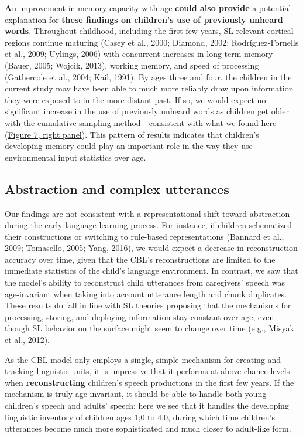\documentclass[
  english,
  man,mask,floatsintext]{apa6}
\begin{document}
\textbf{A}n improvement in memory capacity with age \textbf{could also provide} a potential explanation for \textbf{these findings on children's use of previously unheard words}. Throughout childhood, including the first few years, SL-relevant cortical regions continue maturing (Casey et al., 2000; Diamond, 2002; Rodríguez-Fornells et al., 2009; Uylings, 2006) with concurrent increases in long-term memory (Bauer, 2005; Wojcik, 2013), working memory, and speed of processing (Gathercole et al., 2004; Kail, 1991). By ages three and four, the children in the current study may have been able to much more reliably draw upon information they were exposed to in the more distant past. If so, we would expect no significant increase in the use of previously unheard words as children get older with the cumulative sampling method---consistent with what we found here (\protect\hyperlink{fig7}{Figure 7, right panel}). This pattern of results indicates that children's developing memory could play an important role in the way they use environmental input statistics over age.

\hypertarget{abstraction-and-complex-utterances}{%
\subsection{Abstraction and complex utterances}\label{abstraction-and-complex-utterances}}

Our findings are not consistent with a representational shift toward abstraction during the early language learning process. For instance, if children schematized their constructions or switching to rule-based representations (Bannard et al., 2009; Tomasello, 2005; Yang, 2016), we would expect a decrease in reconstruction accuracy over time, given that the CBL's reconstructions are limited to the immediate statistics of the child's language environment. In contrast, we saw that the model's ability to reconstruct child utterances from caregivers' speech was age-invariant when taking into account utterance length and chunk duplicates. These results do fall in line with SL theories proposing that the mechanisms for processing, storing, and deploying information stay constant over age, even though SL behavior on the surface might seem to change over time (e.g., Misyak et al., 2012).

As the CBL model only employs a single, simple mechanism for creating and tracking linguistic units, it is impressive that it performs at above-chance levels when \textbf{reconstructing} children's speech productions in the first few years. If the mechanism is truly age-invariant, it should be able to handle both young children's speech and adults' speech; here we see that it handles the developing linguistic inventory of children ages 1;0 to 4;0, during which time children's utterances become much more sophisticated and much closer to adult-like form.
\end{document}
